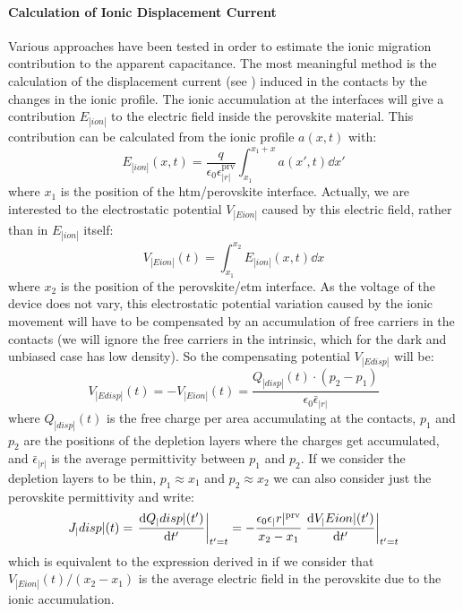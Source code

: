 	\paragraph{Calculation of Ionic Displacement Current}\label{displacement_current_ionic}
	Various approaches have been tested in order to estimate the ionic migration contribution to the apparent capacitance.
	The most meaningful method is the calculation of the displacement current (see ) induced in the contacts by the changes in the ionic profile.
	The ionic accumulation at the interfaces will give a contribution $E_|ion|$ to the electric field inside the perovskite material.
	This contribution can be calculated from the ionic profile $a(x,t)$ with:
	\begin{equation}
		E_|ion|(x,t) = \frac{q}{\epsilon_0 \epsilon_|r|^{\mathrm{prv}}} \int_{x_1}^{x_1 + x} a(x',t) \dd x'
	\end{equation}
	where $x_1$ is the position of the \gls{htm}\-/perovskite interface.
	Actually, we are interested to the electrostatic potential $V_|Eion|$ caused by this electric field, rather than in $E_|ion|$ itself:
		\begin{equation}
		V_|Eion|(t) = \int_{x_1}^{x_2} E_|ion|(x,t) \dd x
		\end{equation}
		where $x_2$ is the position of the perovskite\-/\gls{etm} interface.
		As the voltage of the device does not vary, this electrostatic potential variation caused by the ionic movement will have to be compensated by an accumulation of free carriers in the contacts (we will ignore the free carriers in the intrinsic, which for the dark and unbiased case has low density).
		So the compensating potential $V_|Edisp|$ will be:
				\begin{equation}
				V_|Edisp|(t) = -V_|Eion|(t) = \frac{Q_|disp|(t) \cdot (p_2-p_1)}{\epsilon_0 \bar\epsilon_|r|}
				\end{equation}
				where $Q_|disp|(t)$ is the free charge per area accumulating at the contacts, $p_1$ and $p_2$ are the positions of the depletion layers where the charges get accumulated, and $\bar\epsilon_|r|$ is the average permittivity between $p_1$ and $p_2$.
		If we consider the depletion layers to be thin, $p_1 \approx x_1$ and $p_2 \approx x_2$ we can also consider just the perovskite permittivity and write:
						\begin{equation}
		J_|disp|(t) = \eval{\dv{Q_|disp|(t')}{t'}}_{t'=t} = -\frac{\epsilon_0 \epsilon_|r|^{\mathrm{prv}}}{x_2-x_1} \eval{\dv{V_|Eion|(t')}{t'}}_{t'=t}
						\end{equation}
						which is equivalent to the expression derived in  if we consider that $V_|Eion|(t)/(x_2-x_1)$ is the average electric field in the perovskite due to the ionic accumulation.
	
